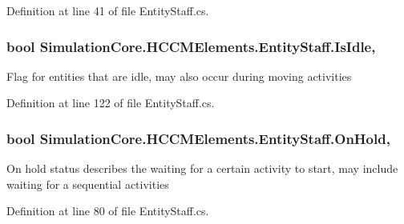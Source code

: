 Definition at line 41 of file Entity\+Staff.\+cs.

\subsubsection[{\texorpdfstring{Is\+Idle}{IsIdle}}]{\setlength{\rightskip}{0pt plus 5cm}bool Simulation\+Core.\+H\+C\+C\+M\+Elements.\+Entity\+Staff.\+Is\+Idle\hspace{0.3cm}{\ttfamily [get]}, {\ttfamily [set]}}\hypertarget{class_simulation_core_1_1_h_c_c_m_elements_1_1_entity_staff_a84eb0c8740d3bfb6c6e04e5fdac85b64}{}\label{class_simulation_core_1_1_h_c_c_m_elements_1_1_entity_staff_a84eb0c8740d3bfb6c6e04e5fdac85b64}


Flag for entities that are idle, may also occur during moving activities 



Definition at line 122 of file Entity\+Staff.\+cs.

\subsubsection[{\texorpdfstring{On\+Hold}{OnHold}}]{\setlength{\rightskip}{0pt plus 5cm}bool Simulation\+Core.\+H\+C\+C\+M\+Elements.\+Entity\+Staff.\+On\+Hold\hspace{0.3cm}{\ttfamily [get]}, {\ttfamily [set]}}\hypertarget{class_simulation_core_1_1_h_c_c_m_elements_1_1_entity_staff_a74900ce804f001734277a61ab3317f71}{}\label{class_simulation_core_1_1_h_c_c_m_elements_1_1_entity_staff_a74900ce804f001734277a61ab3317f71}


On hold status describes the waiting for a certain activity to start, may include waiting for a sequential activities 



Definition at line 80 of file Entity\+Staff.\+cs.

